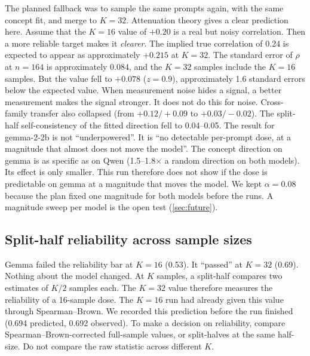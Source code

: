 \documentclass[11pt]{article}
\begin{document}
The planned fallback was to sample the same prompts again, with the same concept fit, and merge to
$K=32$. Attenuation theory gives a clear prediction here. Assume that the $K=16$ value of $+0.20$ is a real
but noisy correlation. Then a more reliable target makes it \emph{clearer}. The implied true correlation of
0.24 is expected to appear as approximately $+0.215$ at $K=32$. The standard error of $\rho$ at $n=164$ is
approximately 0.084, and the $K=32$ samples include the $K=16$ samples. But the value fell to $+0.078$
($z=0.9$), approximately 1.6 standard errors below the expected value. When
measurement noise hides a signal, a better measurement makes the signal stronger. It does not do this for
noise. Cross-family transfer also collapsed (from $+0.12/+0.09$ to $+0.03/-0.02$). The split-half
self-consistency of the fitted direction fell to 0.04--0.05. The result for gemma-2-2b is not ``underpowered''. It is ``no detectable per-prompt dose, at a magnitude that almost does not move the
model''. The concept direction on gemma is as specific as on Qwen (1.5--1.8$\times$ a random direction on
both models). Its effect is only smaller. This run therefore does not show if the dose is predictable on gemma at a magnitude that moves the model. We kept $\alpha=0.08$ because the plan fixed one magnitude for both
models before the runs. A magnitude sweep per model is the open test (\cref{sec:future}).

\subsection{Split-half reliability across sample sizes}
\label{sec:splithalf}
Gemma failed the reliability bar at $K=16$ (0.53). It ``passed'' at $K=32$ (0.69). Nothing about the model
changed. At $K$ samples, a split-half compares two estimates of $K/2$ samples each. The $K=32$ value therefore measures the reliability of a 16-sample dose. The $K=16$ run had already given this value through
Spearman--Brown. We recorded this prediction before the run finished (0.694 predicted, 0.692 observed). To
make a decision on reliability, compare Spearman--Brown-corrected full-sample values, or split-halves at
the same half-size. Do not compare the raw statistic across different $K$.
\end{document}
